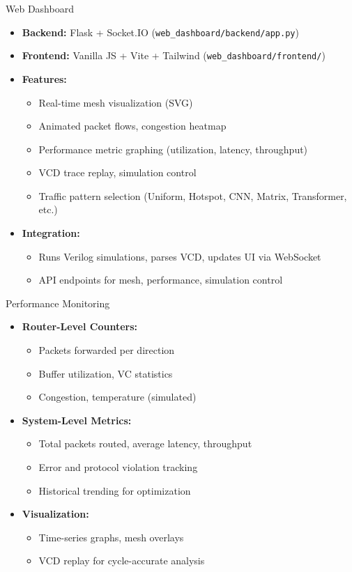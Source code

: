 \documentclass{beamer}
\begin{document}
\begin{frame}{Web Dashboard}
  \begin{itemize}
    \item \textbf{Backend:} Flask + Socket.IO (\texttt{web\_dashboard/backend/app.py})
    \item \textbf{Frontend:} Vanilla JS + Vite + Tailwind (\texttt{web\_dashboard/frontend/})
    \item \textbf{Features:}
      \begin{itemize}
        \item Real-time mesh visualization (SVG)
        \item Animated packet flows, congestion heatmap
        \item Performance metric graphing (utilization, latency, throughput)
        \item VCD trace replay, simulation control
        \item Traffic pattern selection (Uniform, Hotspot, CNN, Matrix, Transformer, etc.)
      \end{itemize}
    \item \textbf{Integration:}
      \begin{itemize}
        \item Runs Verilog simulations, parses VCD, updates UI via WebSocket
        \item API endpoints for mesh, performance, simulation control
      \end{itemize}
  \end{itemize}
\end{frame}

\begin{frame}{Performance Monitoring}
  \begin{itemize}
    \item \textbf{Router-Level Counters:}
      \begin{itemize}
        \item Packets forwarded per direction
        \item Buffer utilization, VC statistics
        \item Congestion, temperature (simulated)
      \end{itemize}
    \item \textbf{System-Level Metrics:}
      \begin{itemize}
        \item Total packets routed, average latency, throughput
        \item Error and protocol violation tracking
        \item Historical trending for optimization
      \end{itemize}
    \item \textbf{Visualization:}
      \begin{itemize}
        \item Time-series graphs, mesh overlays
        \item VCD replay for cycle-accurate analysis
      \end{itemize}
  \end{itemize}
\end{frame}
\end{document}
